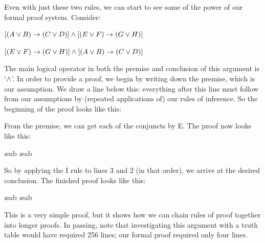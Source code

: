Even with just these two rules, we can start to see some of the power of our formal proof system. Consider:
\begin{earg}
\item[] $[(A\vee B)\rightarrow(C\vee D)] \wedge [(E \vee F) \rightarrow (G\vee H)]$
\item[\texttherefore] $[(E \vee F) \rightarrow (G\vee H)] \wedge [(A\vee B)\rightarrow(C\vee D)]$
\end{earg}
The main logical operator in both the premise and conclusion of this argument is `$\wedge$'. In order to provide a proof, we begin by writing down the premise, which is our assumption. We draw a line below this: everything after this line must follow from our assumptions by (repeated applications of) our rules of inference. So the beginning of the proof looks like this:
\begin{fitchproof}
	\PR
\end{fitchproof}
From the premise, we can get each of the conjuncts by {\eand}E. The proof now looks like this:
\begin{fitchproof}
	\PR
	 \ae{ab}
	 \ae{ab}
\end{fitchproof}
So by applying the {\eand}I rule to lines 3 and 2 (in that order), we arrive at the desired conclusion. The finished proof looks like this:
\begin{fitchproof}
	\PR

	 \ae{ab}
	 \ae{ab}
	 
\end{fitchproof}
This is a very simple proof, but it shows how we can chain rules of proof together into longer proofs. In passing, note that investigating this argument with a truth table would have required 256 lines; our formal proof required only four lines.

